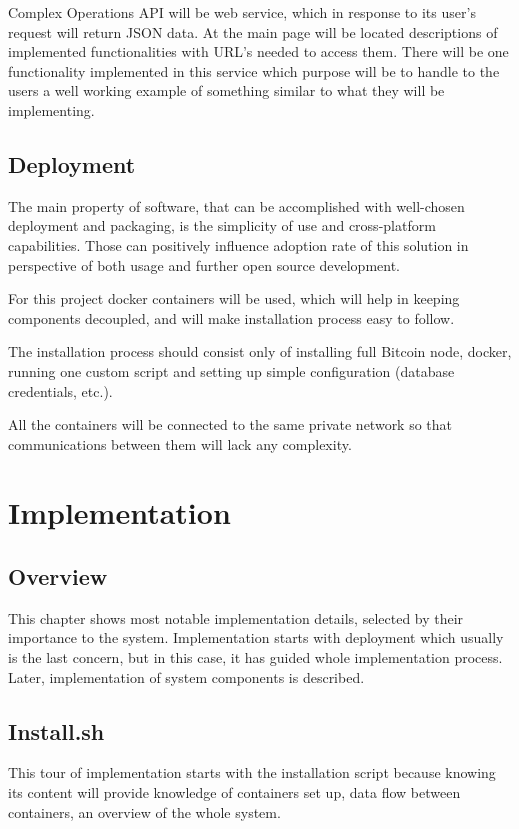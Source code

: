 \documentclass[12pt, en, eng, twoside, final]{mgr}
\begin{document}
Complex Operations API will be web service, which in response to its user's request will return JSON data. At the main page will be located descriptions of implemented functionalities with URL's needed to access them. There will be one functionality implemented in this service which purpose will be to handle to the users a well working example of something similar to what they will be implementing.   

\section{Deployment}

The main property of software, that can be accomplished with well-chosen deployment and packaging, is the simplicity of use and cross-platform capabilities. Those can positively influence adoption rate of this solution in perspective of both usage and further open source development.

For this project docker \cite{docker} containers will be used, which will help in keeping components decoupled, and will make installation process easy to follow. 

The installation process should consist only of installing full Bitcoin node, docker, running one custom script and setting up simple configuration (database credentials, etc.).

All the containers will be connected to the same private network so that communications between them will lack any complexity.

\chapter{Implementation}

\section{Overview}
This chapter shows most notable implementation details, selected by their importance to the system. Implementation starts with deployment which usually is the last concern, but in this case, it has guided whole implementation process. Later, implementation of system components is described.

\section{Install.sh}
This tour of implementation starts with the installation script because knowing its content will provide knowledge of containers set up, data flow between containers, an overview of the whole system.
\end{document}
